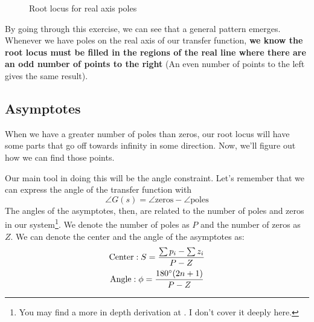 \begin{figure}[ht]
    \caption{Root locus for real axis poles}
    \label{fig:completed rl real}
\end{figure}

By going through this exercise, we can see that a general pattern emerges. Whenever we have poles on the real axis of our transfer function, \textbf{we know the root locus must be filled in the regions of the real line where there are an odd number of points to the right} (An even number of points to the left gives the same result).

\subsection{Asymptotes}

When we have a greater number of poles than zeros, our root locus will have some parts that go off towards infinity in some direction. Now, we'll figure out how we can find those points.

Our main tool in doing this will be the angle constraint. Let's remember that we can express the angle of the transfer function with
$$\angle G(s)=\angle\text{zeros}-\angle\text{poles}$$
The angles of the asymptotes, then, are related to the number of poles and zeros in our system\footnote{You may find a more in depth derivation at \cite{peet_root_nodate}. I don't cover it deeply here.}.  We denote the number of poles as $P$ and the number of zeros as $Z$. We can denote the center and the angle of the asymptotes as:
\begin{gather}
    \text{Center}: S=\frac{\sum p_i-\sum z_i}{P-Z}\\
    \text{Angle}: \phi=\frac{180\degree(2n+1)}{P-Z} 
\end{gather}

